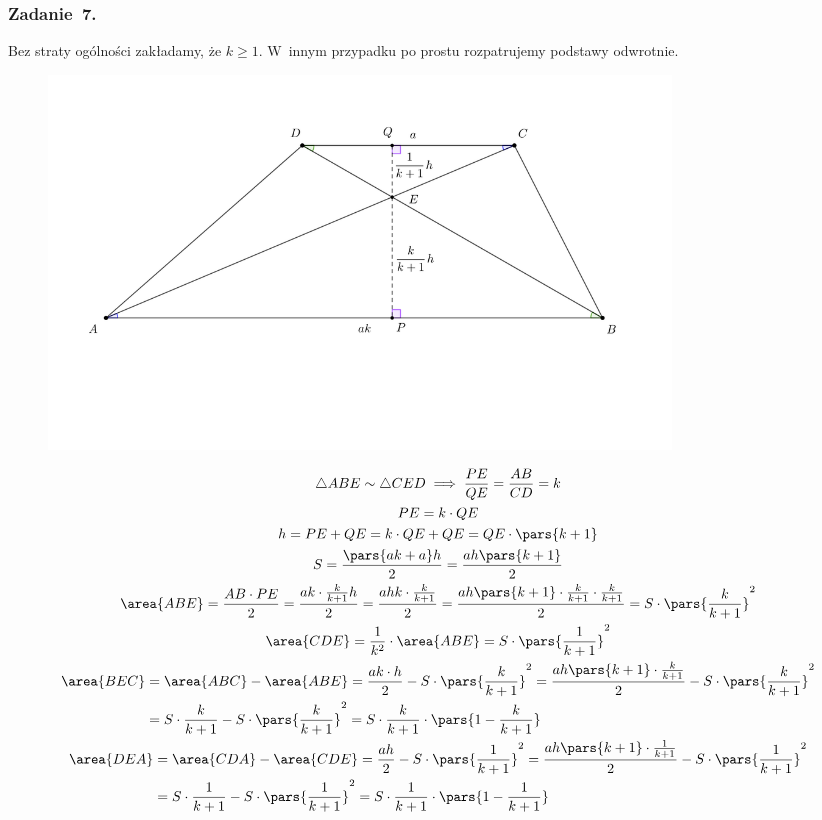 \subsubsection*{Zadanie~7.}
Bez straty ogólności zakładamy, że \(k \geq 1\). W~innym przypadku po prostu rozpatrujemy podstawy odwrotnie.
\begin{figure}[H]
    \centering
    \includegraphics[width=0.8\textwidth]{img/2020_12_16/7.png}
\end{figure}
\begin{gather*}
    \triangle{ABE} \sim \triangle{CED} \implies \frac{PE}{QE} = \frac{AB}{CD} = k\\
    PE = k \cdot QE\\
    h = PE + QE = k \cdot QE + QE = QE \cdot \pars{k + 1}\\
    S = \frac{\pars{ak + a}h}{2} = \frac{ah\pars{k + 1}}{2}\\
    \area{ABE} = \frac{AB \cdot PE}{2}
        = \frac{ak \cdot \frac{k}{k + 1}h}{2}
        = \frac{ahk \cdot \frac{k}{k + 1}}{2}
        = \frac{ah\pars{k + 1} \cdot \frac{k}{k + 1} \cdot \frac{k}{k + 1}}{2}
        = S \cdot \pars{\frac{k}{k + 1}}^2\\
    \area{CDE} = \frac{1}{k^2} \cdot \area{ABE} = S \cdot \pars{\frac{1}{k + 1}}^2\\
    \begin{split}
        \area{BEC} &= \area{ABC} - \area{ABE}
            = \frac{ak \cdot h}{2} - S \cdot \pars{\frac{k}{k + 1}}^2
            = \frac{ah\pars{k + 1} \cdot \frac{k}{k + 1}}{2} - S \cdot \pars{\frac{k}{k + 1}}^2\\
            &= S \cdot \frac{k}{k + 1} - S \cdot \pars{\frac{k}{k + 1}}^2
            = S \cdot \frac{k}{k + 1} \cdot \pars{1 - \frac{k}{k + 1}}
    \end{split}\\
    \begin{split}
        \area{DEA} &= \area{CDA} - \area{CDE}
            = \frac{ah}{2} - S \cdot \pars{\frac{1}{k + 1}}^2
            = \frac{ah\pars{k + 1} \cdot \frac{1}{k + 1}}{2} - S \cdot \pars{\frac{1}{k + 1}}^2\\
            &= S \cdot \frac{1}{k + 1} - S \cdot\pars{\frac{1}{k + 1}}^2
            = S \cdot \frac{1}{k + 1} \cdot \pars{1 - \frac{1}{k + 1}}
    \end{split}
\end{gather*}
